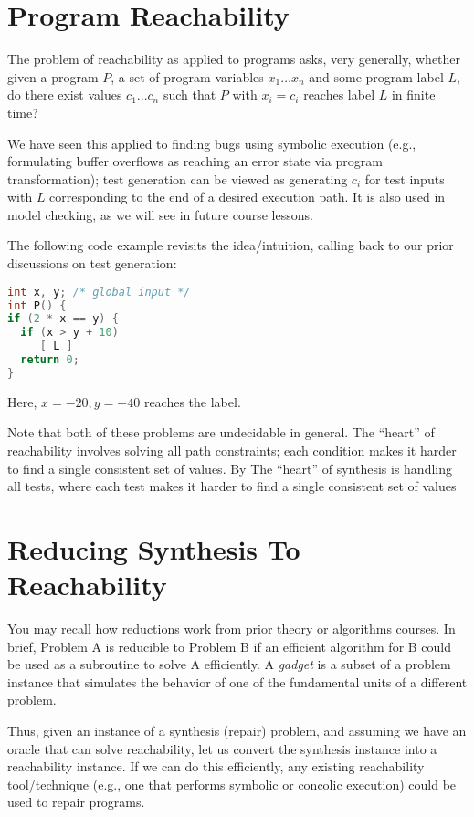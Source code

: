\documentclass[11pt]{article}
\begin{document}
\section{Program Reachability}

The problem of reachability as applied to programs asks, very generally, whether
given a program $P$, a set of program variables $x_1 \ldots x_n$ and some
program label $L$, do there exist values $c_1 ... c_n$ such that $P$ with
$x_i = c_i$ reaches label $L$ in finite time?

We have seen this applied to finding bugs using symbolic execution (e.g., formulating
buffer overflows as reaching an error state via program transformation); test
generation can be viewed as generating $c_i$ for test inputs with $L$
corresponding to the end of a desired execution path.  It is
also used in model checking, as we will see in future course lessons.  

The following code example revisits the idea/intuition, calling back to our
prior discussions on test generation:

\begin{lstlisting}[language=C]
int x, y; /* global input */
int P() { 
if (2 * x == y) {
  if (x > y + 10) 
     [ L ]
  return 0;
}
\end{lstlisting}

Here, $x = -20, y=-40$ reaches the label. 

Note that both of these problems are undecidable in general.  
The ``heart'' of reachability involves solving all path constraints; 
each condition makes it harder to find a single consistent set of values.  By
The ``heart'' of synthesis is handling all tests, where each test makes it 
harder to find a single consistent set of values

\section{Reducing Synthesis To Reachability}

You may recall how reductions work from prior theory or algorithms courses.  
In brief, Problem A is reducible to Problem B if an efficient algorithm for B
could be used as a subroutine to solve A efficiently. A \emph{gadget} is a subset of a
problem instance that simulates the behavior of one of the fundamental units of
a different problem.

Thus, given an instance of a synthesis (repair) problem, and assuming we have an
oracle that can solve reachability, let us convert the synthesis instance into a
reachability instance. If we can do this efficiently, any existing reachability
tool/technique (e.g., one that performs symbolic or concolic execution) could be
used to repair programs.
\end{document}
